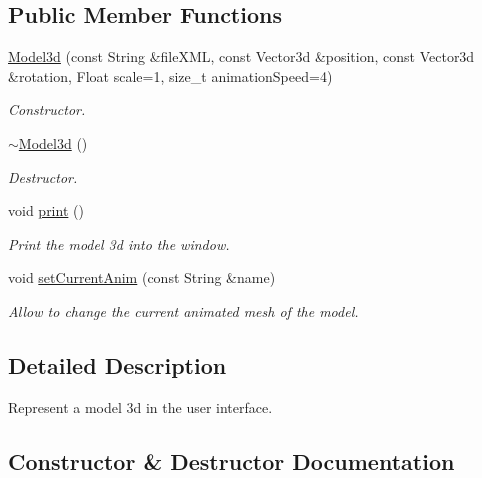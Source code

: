 \subsection*{Public Member Functions}
\begin{DoxyCompactItemize}
\item 
\hyperlink{classModel3d_a3382c1519f85b695a1d98b492207c339}{Model3d} (const String \&file\+X\+ML, const Vector3d \&position, const Vector3d \&rotation, Float scale=1, size\+\_\+t animation\+Speed=4)
\begin{DoxyCompactList}\small\item\em Constructor. \end{DoxyCompactList}\item 
\mbox{\label{classModel3d_a7a4ec3be34c901538574d99d95a46b04}} 
\hyperlink{classModel3d_a7a4ec3be34c901538574d99d95a46b04}{$\sim$\+Model3d} ()
\begin{DoxyCompactList}\small\item\em Destructor. \end{DoxyCompactList}\item 
\mbox{\label{classModel3d_ab1d6c9347c05323f85e5decb7e73cd1e}} 
void \hyperlink{classModel3d_ab1d6c9347c05323f85e5decb7e73cd1e}{print} ()
\begin{DoxyCompactList}\small\item\em Print the model 3d into the window. \end{DoxyCompactList}\item 
void \hyperlink{classModel3d_a29eeaa6769b0c21268f4704ac2d404b7}{set\+Current\+Anim} (const String \&name)
\begin{DoxyCompactList}\small\item\em Allow to change the current animated mesh of the model. \end{DoxyCompactList}\end{DoxyCompactItemize}


\subsection{Detailed Description}
Represent a model 3d in the user interface. 

\subsection{Constructor \& Destructor Documentation}
\mbox{\label{classModel3d_a3382c1519f85b695a1d98b492207c339}} 
